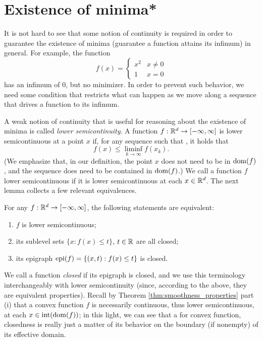 \section{Existence of minima*}
\label{sec:existence_minima}

It is not hard to see that some notion of continuity is required in order to
guarantee the existence of minima (guarantee a function attains its infimum) in
general. For example, the function
\begin{equation}
\label{eq:discontinuous_quadratic}
f(x) = \begin{cases}
x^2 & x \not= 0 \\
1 & x = 0
\end{cases}
\end{equation}
has an infimum of 0, but no minimizer. In order to prevent such behavior, we
need some condition that restricts what can happen as we move along a sequence
that drives a function to its infimum.  

A weak notion of continuity that is useful for reasoning about the existence  
of minima is called \emph{lower semicontinuity}. A function $f : \mathbb{R}^d \to 
[-\infty, \infty]$ is lower semicontinuous at a point $x$ if, for any sequence 
such that , it holds that 
\[
f(x) \leq \liminf_{k \to \infty} f(x_k). 
\]
(We emphasize that, in our definition, the point $x$ does not need to be in
$\operatorname{dom}(f)$, and the sequence  does need to be
contained in $\operatorname{dom}(f)$.)  We call a function $f$ lower semicontinuous if it
is lower semicontinuous at each $x \in \mathbb{R}^d$. The next lemma collects a few 
relevant equivalences.

\begin{Lemma}
\label{lem:lower_semicontinuous}
For any $f : \mathbb{R}^d \to [-\infty, \infty]$, the following statements are equivalent:
\begin{enumerate}[label=(\roman*)]
\item $f$ is lower semicontinuous;
\item its sublevel sets $\{x : f(x) \leq t\}$, $t \in \mathbb{R}$ are all closed;
\item its epigraph $\operatorname{epi}(f) = \{(x,t) : f(x) \leq t\}$ is closed. 
\end{enumerate}
\end{Lemma}

We call a function \emph{closed} if its epigraph is closed, and we use this
terminology interchangeably with lower semicontinuity (since, according to the
above, they are equivalent properties). Recall by Theorem
\ref{thm:smoothness_properties} part (i) that a convex function $f$ is
necessarily continuous, thus lower semicontinuous, at each $x \in
\operatorname{int}(\operatorname{dom}(f))$; in this light, we can see that a for convex function,
closedness is really just a matter of its behavior on the boundary (if nonempty)
of its effective domain.

